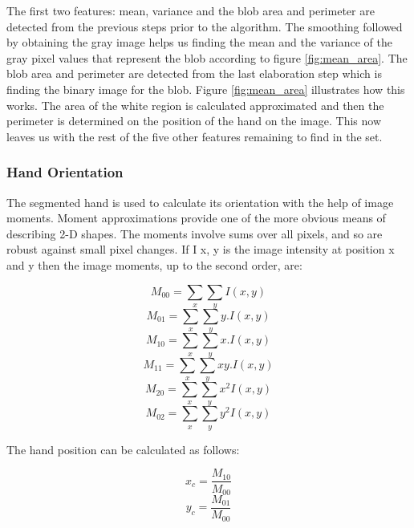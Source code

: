 \bigskip
The first two features: mean, variance and the blob area and perimeter are detected from the previous steps prior to the algorithm. The smoothing followed by obtaining the gray image helps us finding the mean and the variance of the gray pixel values that represent the blob according to figure \ref{fig:mean_area}. The blob area and perimeter are detected from the last elaboration step which is finding the binary image for the blob. Figure \ref{fig:mean_area} illustrates how this works. The area of the white region is calculated approximated and then the perimeter is determined on the position of the hand on the image. This now leaves us with the rest of the five other features remaining to find in the set.
\bigskip
\subsubsection{Hand Orientation}
The segmented hand is used to calculate its orientation with the help of image moments. Moment approximations provide one of the more obvious means of describing 2-D shapes\cite{feature1}. The moments involve sums over all pixels, and so are robust against small pixel changes\cite{feature2}. If I x, y is the image intensity at position x and y then the image moments, up to the second order, are:
\bigskip
\begin{dBox}
\begin{equation}
	M_{00}= \sum_{x}\sum_{y}I(x,y)
\end{equation}
\begin{equation}
	M_{01}= \sum_{x}\sum_{y}y.I(x,y)
\end{equation}
\begin{equation}
	M_{10}= \sum_{x}\sum_{y}x.I(x,y)
\end{equation}
\begin{equation}
	M_{11}= \sum_{x}\sum_{y}xy.I(x,y)
\end{equation}
\begin{equation}
	M_{20}= \sum_{x}\sum_{y}x^{2}I(x,y)
\end{equation}
\begin{equation}
	M_{02}= \sum_{x}\sum_{y}y^{2}I(x,y)
\end{equation}
\end{dBox}
\bigskip
The hand position can be calculated as follows:
\bigskip
\begin{dBox}
\begin{equation}
	x_{c} = \frac{M_{10}}{M_{00}}
\end{equation}
\begin{equation}
	y_{c} = \frac{M_{01}}{M_{00}}
\end{equation}
\end{dBox}
